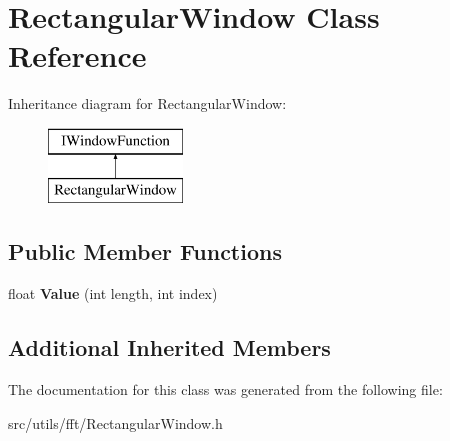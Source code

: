 \hypertarget{class_rectangular_window}{}\section{Rectangular\+Window Class Reference}
\label{class_rectangular_window}
Inheritance diagram for Rectangular\+Window\+:\begin{figure}[H]
\begin{center}
\leavevmode
\includegraphics[height=2.000000cm]{class_rectangular_window}
\end{center}
\end{figure}
\subsection*{Public Member Functions}
\begin{DoxyCompactItemize}
\item 
\mbox{\label{class_rectangular_window_a0c520360dd49ecaafeb300f78c09fd44}} 
float {\bfseries Value} (int length, int index)
\end{DoxyCompactItemize}
\subsection*{Additional Inherited Members}


The documentation for this class was generated from the following file\+:\begin{DoxyCompactItemize}
\item 
src/utils/fft/Rectangular\+Window.\+h\end{DoxyCompactItemize}
